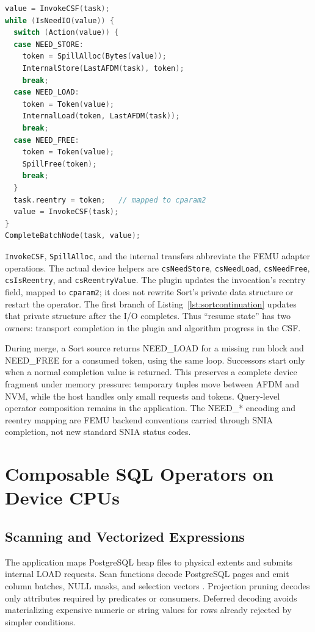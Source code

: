 \documentclass[sigconf, nonacm]{acmart}
\begin{document}
\begin{lstlisting}[style=demo,language=C,caption={FEMU plugin: perform the requested I/O, update invocation state, and reenter the same CSF.},label={lst:plugincontinuation}]
value = InvokeCSF(task);
while (IsNeedIO(value)) {
  switch (Action(value)) {
  case NEED_STORE:
    token = SpillAlloc(Bytes(value));
    InternalStore(LastAFDM(task), token);
    break;
  case NEED_LOAD:
    token = Token(value);
    InternalLoad(token, LastAFDM(task));
    break;
  case NEED_FREE:
    token = Token(value);
    SpillFree(token);
    break;
  }
  task.reentry = token;   // mapped to cparam2
  value = InvokeCSF(task);
}
CompleteBatchNode(task, value);
\end{lstlisting}

\texttt{InvokeCSF}, \texttt{SpillAlloc}, and the internal transfers abbreviate
the FEMU adapter operations. The actual device helpers are
\texttt{csNeedStore}, \texttt{csNeedLoad}, \texttt{csNeedFree},
\texttt{csIsReentry}, and \texttt{csReentryValue}. The plugin updates the
invocation's reentry field, mapped to \texttt{cparam2}; it does not rewrite
Sort's private data structure or restart the operator. The first branch of
Listing~\ref{lst:sortcontinuation} updates that private structure after the
I/O completes. Thus ``resume state'' has two owners: transport completion in
the plugin and algorithm progress in the CSF.

During merge, a Sort source returns NEED\_LOAD for a missing run block and
NEED\_FREE for a consumed token, using the same loop. Successors start only
when a normal completion value is returned. This preserves a complete device
fragment under memory pressure: temporary tuples move between AFDM and NVM,
while the host handles only small requests and tokens. Query-level operator
composition remains in the application. The NEED\_* encoding and reentry
mapping are FEMU backend conventions carried through SNIA completion, not
new standard SNIA status codes.

\section{Composable SQL Operators on Device CPUs}
\label{sec:operators}
\subsection{Scanning and Vectorized Expressions}
The application maps PostgreSQL heap files to physical extents and submits
internal LOAD requests. Scan functions decode PostgreSQL pages and emit
column batches, NULL masks, and selection vectors \cite{pgstorage}.
Projection pruning decodes only attributes required by predicates or
consumers. Deferred decoding avoids materializing expensive numeric or
string values for rows already rejected by simpler conditions.
\end{document}
